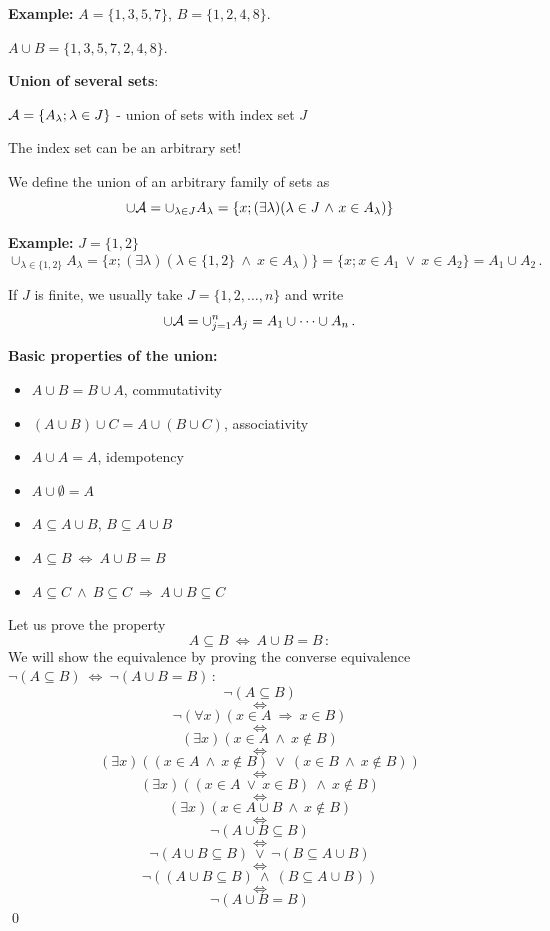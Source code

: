 \documentclass[11pt,paper=b5,footinclude,headinclude]{scrbook} %
\def\ali {{~\vee~}}
\def\inn {{~\wedge~}}
\def\sledi {{~\Rightarrow~}}
\def\cee {{~\Leftrightarrow~}}
\theoremstyle{remark}
\theoremstyle{definition} %
\theoremstyle{theorem} %
\begin{document}
\textbf{ Example:}
$A = \{1,3,5,7\}$, $B = \{1,2,4,8\}$.

$A\cup B = \{1,3,5,7,2,4,8\}$.

\medskip

\textbf{ Union of several sets}:

${\cal A} = \{A_\lambda; \lambda \in J\}$ - union of sets with index set $J$

The index set can be an arbitrary set!

We define the union of an arbitrary family of sets as
$$\cup {\cal A} = \cup_{\lambda \in J} A_\lambda = \{x;(\exists \lambda) (\lambda \in J\inn x\in A_\lambda)\}$$

\medskip
\textbf{ Example:} $J = \{1,2\}$
$$\cup_{\lambda \in \{1,2\}} A_\lambda = \{x;(\exists \lambda) (\lambda \in \{1,2\}\inn x\in A_\lambda)\}= \{x;x\in A_1 \ali x\in A_2\} = A_1\cup A_2\,.$$

\medskip
If $J$ is finite, we usually take $J = \{1,2,\ldots, n\}$ and write
$$\cup {\cal A} = \cup_{j = 1}^nA_j = A_1\cup\cdots\cup A_n\,.$$

\bigskip
\textbf{ Basic properties of the union:}
\begin{itemize}
  \item $A\cup B = B\cup A$, commutativity
  \item $(A\cup B)\cup C = A\cup (B\cup C)$, associativity
  \item $A\cup A = A$, idempotency
  \item $A\cup \emptyset = A$
  \item $A\subseteq A\cup B$, $B\subseteq A\cup B$
  \item $A\subseteq B\cee A\cup B = B$
  \item $A\subseteq C\inn B\subseteq C\sledi A\cup B \subseteq C$
\end{itemize}

\bigskip
Let us prove the property
$$A\subseteq B\cee A\cup B = B\,:$$
\medskip
We will show the equivalence by proving the converse equivalence
$\neg(A\subseteq B)\cee \neg(A\cup B = B)\,:$
$$\neg(A\subseteq B)$$
$$\cee$$
$$\neg(\forall x)(x\in A\sledi x\in B)$$
$$\cee$$
$$(\exists x)(x\in A \inn x\not\in B)$$
$$\cee$$
$$(\exists x)((x\in A \inn x\not\in B) \ali (x\in B \inn x\not\in B))$$
$$\cee$$
$$(\exists x)((x\in A \ali x\in B)\inn x\not\in B)$$
$$\cee$$
$$(\exists x)(x\in A\cup B\inn x\not\in B)$$
$$\cee$$
$$\neg(A\cup B \subseteq B)$$
$$\cee$$
$$\neg(A\cup B \subseteq B) \ali \neg(B \subseteq A\cup B) $$
$$\cee$$
$$\neg((A\cup B \subseteq B)\inn (B \subseteq A\cup B))$$
$$\cee$$
$$\neg(A\cup B = B)$$
\qed
\end{document}
